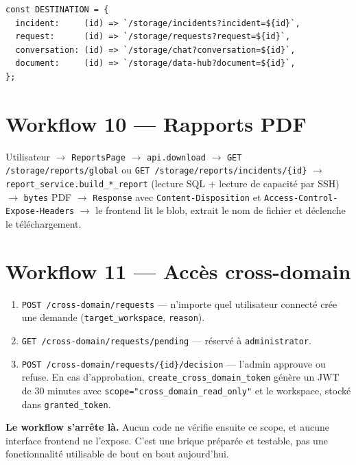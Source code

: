 \documentclass[11pt,a4paper]{report}
\newcommand{\fn}[1]{\texttt{\small\textcolor{oasisviolet}{#1}}}
\newcommand{\cls}[1]{\texttt{\small\textcolor{oasisblue}{#1}}}
\newcommand{\route}[1]{\texttt{\small\textcolor{oasisgreen}{#1}}}
\newcommand{\arrowto}{\ensuremath{\rightarrow}}
\begin{document}
\begin{lstlisting}[caption={frontend/src/components/layout/GlobalSearch.tsx}]
const DESTINATION = {
  incident:     (id) => `/storage/incidents?incident=${id}`,
  request:      (id) => `/storage/requests?request=${id}`,
  conversation: (id) => `/storage/chat?conversation=${id}`,
  document:     (id) => `/storage/data-hub?document=${id}`,
};
\end{lstlisting}

\section{Workflow 10 --- Rapports PDF}

Utilisateur \arrowto{} \cls{ReportsPage} \arrowto{} \fn{api.download} \arrowto{}
\route{GET /storage/reports/global} ou
\route{GET /storage/reports/incidents/\{id\}} \arrowto{}
\fn{report\_service.build\_*\_report} (lecture SQL + lecture de capacité par SSH)
\arrowto{} \texttt{bytes} PDF \arrowto{} \texttt{Response} avec
\texttt{Content-Disposition} et \texttt{Access-Control-Expose-Headers}
\arrowto{} le frontend lit le blob, extrait le nom de fichier et déclenche le
téléchargement.

\section{Workflow 11 --- Accès cross-domain}

\begin{enumerate}
  \item \route{POST /cross-domain/requests} --- n'importe quel utilisateur
  connecté crée une demande (\texttt{target\_workspace}, \texttt{reason}).
  \item \route{GET /cross-domain/requests/pending} --- réservé à
  \texttt{administrator}.
  \item \route{POST /cross-domain/requests/\{id\}/decision} --- l'admin approuve
  ou refuse. En cas d'approbation, \fn{create\_cross\_domain\_token} génère un
  JWT de 30 minutes avec \texttt{scope="cross\_domain\_read\_only"} et le
  workspace, stocké dans \texttt{granted\_token}.
\end{enumerate}

\begin{warnbox}
\textbf{Le workflow s'arrête là.} Aucun code ne vérifie ensuite ce scope, et
aucune interface frontend ne l'expose. C'est une brique préparée et testable,
pas une fonctionnalité utilisable de bout en bout aujourd'hui.
\end{warnbox}
\end{document}
